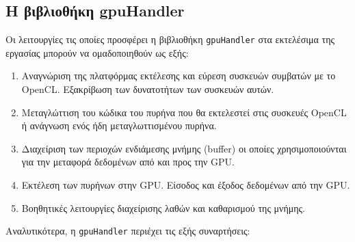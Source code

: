 \subsection{Η βιβλιοθήκη gpuHandler} 
\label{chapter:gpuhandler}
 \noindent Οι λειτουργίες τις οποίες προσφέρει η βιβλιοθήκη \verb!gpuHandler! στα εκτελέσιμα της εργασίας μπορούν να ομαδοποιηθούν ως εξής:

\begin{enumerate}
\item Αναγνώριση της πλατφόρμας εκτέλεσης και εύρεση συσκευών συμβατών με το OpenCL. Εξακρίβωση των δυνατοτήτων των συσκευών αυτών.
\item Μεταγλώττιση του κώδικα του πυρήνα που θα εκτελεστεί στις συσκευές OpenCL ή ανάγνωση ενός ήδη μεταγλωττισμένου πυρήνα. 
\item Διαχείριση των περιοχών ενδιάμεσης μνήμης (buffer) οι οποίες χρησιμοποιούνται για την μεταφορά δεδομένων από και προς την GPU.
\item Εκτέλεση των πυρήνων στην GPU. Είσοδος και έξοδος δεδομένων από την GPU.
\item Βοηθητικές λειτουργίες διαχείρισης λαθών και καθαρισμού της μνήμης.
\end{enumerate}
Αναλυτικότερα, η \verb!gpuHandler! περιέχει τις εξής συναρτήσεις:

